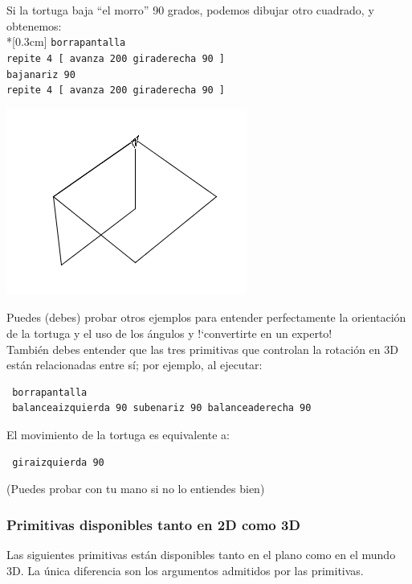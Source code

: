 \parbox{9cm}{
Si la tortuga baja ``el morro'' 90 grados, podemos dibujar otro
cuadrado, y obtenemos:\\*[0.3cm]
\texttt{borrapantalla}\\
\texttt{repite 4 [ avanza 200 giraderecha 90 ]}\\
\texttt{bajanariz 90}\\
\texttt{repite 4 [ avanza 200 giraderecha 90 ]}} \hfill 
\parbox{7cm}{\begin{center}
   \includegraphics[scale=0.5]{Imagenes/05_Primitivas/Perspectiva02.png}
\end{center} }

Puedes (debes) probar otros ejemplos para entender perfectamente la
orientaci\'on de la tortuga y el uso de los \'angulos y !`convertirte en
un experto! \\

\noindent Tambi\'en debes entender que las tres primitivas que controlan la
rotaci\'on en 3D est\'an relacionadas entre s\'i; por ejemplo, al ejecutar:
\begin{verbatim}
 borrapantalla
 balanceaizquierda 90 subenariz 90 balanceaderecha 90\end{verbatim}
El movimiento de la tortuga es equivalente a:
\begin{verbatim}
 giraizquierda 90\end{verbatim}
(Puedes probar con tu mano si no lo entiendes bien)

\subsubsection{Primitivas disponibles tanto en 2D como 3D}

Las siguientes primitivas est\'an disponibles tanto en el plano como en
el mundo 3D. La \'unica diferencia son los argumentos admitidos por las
primitivas. \\

